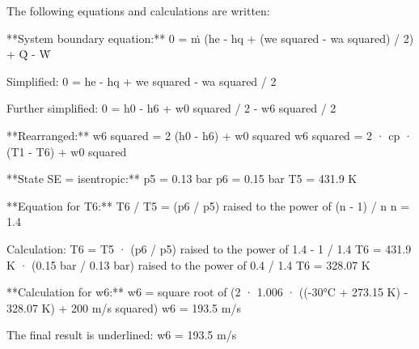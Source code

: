 The following equations and calculations are written:  

**System boundary equation:**  
0 = ṁ (he - hq + (we squared - wa squared) / 2) + Q̇ - Ẇ  

Simplified:  
0 = he - hq + we squared - wa squared / 2  

Further simplified:  
0 = h0 - h6 + w0 squared / 2 - w6 squared / 2  

**Rearranged:**  
w6 squared = 2 (h0 - h6) + w0 squared  
w6 squared = 2 · cp · (T1 - T6) + w0 squared  

**State SE = isentropic:**  
p5 = 0.13 bar  
p6 = 0.15 bar  
T5 = 431.9 K  

**Equation for T6:**  
T6 / T5 = (p6 / p5) raised to the power of (n - 1) / n  
n = 1.4  

Calculation:  
T6 = T5 · (p6 / p5) raised to the power of 1.4 - 1 / 1.4  
T6 = 431.9 K · (0.15 bar / 0.13 bar) raised to the power of 0.4 / 1.4  
T6 = 328.07 K  

**Calculation for w6:**  
w6 = square root of (2 · 1.006 · ((-30°C + 273.15 K) - 328.07 K) + 200 m/s squared)  
w6 = 193.5 m/s  

The final result is underlined:  
w6 = 193.5 m/s